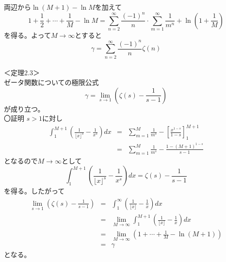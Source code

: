 \documentclass{jsarticle}
\begin{document}
両辺から\(\ln(M+1)-\ln M\)を加えて
\[1+\frac{1}{2}+\cdots+\frac{1}{M}-\ln M=\sum_{n=2}^{\infty}\frac{(-1)^{n}}{n}\cdot\sum_{m=1}^{\infty}\frac{1}{m^{n}}+\ln\left(1+\frac{1}{M}\right)\]
を得る。よって\(M\rightarrow\infty\)とすると
\[\gamma=\sum_{n=2}^{\infty}\frac{(-1)^{n}}{n}\zeta(n)\]
\\
＜定理2.3＞\\
ゼータ関数についての極限公式
\begin{equation}
\gamma=\lim_{s\rightarrow1}\left(\zeta(s)-\frac{1}{s-1}\right)
\end{equation}
が成り立つ。\\
〇証明
\(s>1\)に対し
\begin{eqnarray*}
\int_{1}^{M+1}\left(\frac{1}{\lfloor x\rfloor^{s}}-\frac{1}{x^{s}}\right)dx &=&  \sum_{m=1}^{M}\frac{1}{m^{s}}-\left[\frac{x^{1-s}}{1-s}\right]_{1}^{M+1}\\
&=& \sum_{m=1}^{M}\frac{1}{m^{s}}-\frac{1-(M+1)^{1-s}}{s-1}
\end{eqnarray*}
となるので\(M\rightarrow\infty\)として
\[\int_{1}^{M+1}\left(\frac{1}{\lfloor x\rfloor^{s}}-\frac{1}{x^{s}}\right)dx=\zeta(s)-\frac{1}{s-1}\]
を得る。したがって
\begin{eqnarray*}
\lim_{s\rightarrow1}\left(\zeta(s)-\frac{1}{s-1}\right) &=&\int_{1}^{\infty}\left(\frac{1}{\lfloor x\rfloor}-\frac{1}{x}\right)dx\\
&=&\lim_{M\rightarrow\infty}\int_{1}^{M+1}\left(\frac{1}{\lfloor x\rfloor}-\frac{1}{x}\right)dx\\
&=&\lim_{M\rightarrow\infty}\left(1+\cdots+\frac{1}{M}-\ln(M+1)\right)\\
&=&\gamma
\end{eqnarray*}
となる。





\setcounter{equation}{0}
\end{document}
